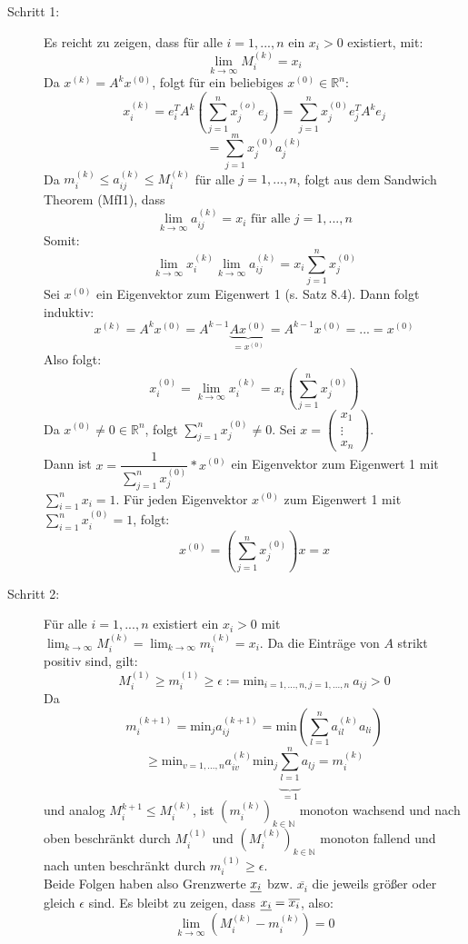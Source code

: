 \documentclass{scrbook}
\begin{document}
\begin{description}
\item[Schritt 1:] Es reicht zu zeigen, dass für alle $i=1,...,n$ ein  $x_i >0$ existiert, mit:
\[\lim_{k \to\infty} M^{(k)}_i=x_i\]
Da $x^{(k)}=A^kx^{(0)}$, folgt für ein beliebiges $x^{(0)} \in \mathbb{R}^n$:\[x^{(k)}_i = e^T_i A^k(\sum ^n_{j=1} x_j^{(o)}e_j)=\sum^n_{j=1}x_j^{(0)}e_j^T A^ke_j\]\[=\sum^m_{j=1}x^{(0)}_ja_j^{(k)}\]
Da $m^{(k)}_i \leq a^{(k)}_{ij}\leq M^{(k)}_i$ für alle $j=1,...,n$, folgt aus dem Sandwich Theorem (MfI1), dass \[\lim_{k\to \infty} a^{(k)}_{ij} = x_i \text{ für alle }j=1,...,n\]
Somit:
\[\lim_{k\to\infty}x^{(k)}_i \lim_{k \to \infty}a^{(k)}_{ij}=x_i\sum^n_{j=1}x^{(0)}_j\]
Sei $x^{(0)}$ ein Eigenvektor zum Eigenwert 1 (s. Satz 8.4). Dann folgt induktiv:
\[x^{(k)}=A^kx^{(0)} = A^{k-1} \underbrace{Ax^{(0)}}_{=x^{(0)}}=A^{k-1}x^{(0)} = ... = x^{(0)}\]
Also folgt:
\[x^{(0)}_i = \lim_{k\to \infty}x^{(k)}_i = x_i \left(\sum^n_{j=1} x^{(0)}_j\right)\]
Da $x^{(0)} \neq 0 \in \mathbb{R}^n$, folgt $\sum^n_{j=1}x^{(0)}_j\neq 0$. Sei $x = \left(
\begin{array}{c}
x_1\\\vdots\\x_n
\end{array}
\right)$.\\ Dann ist $x=\dfrac{1}{\sum^n_{j=1}x^{(0)}_j}*x^{(0)}$ ein Eigenvektor zum Eigenwert 1 mit $\sum^n_{i=1}x_i = 1$. Für jeden Eigenvektor $x^{(0)}$ zum Eigenwert 1 mit $\sum^n_{i=1} x_i^{(0)} = 1$, folgt:
\[x^{(0)} = \left(\sum^n_{j=1}x^{(0)}_j\right)x = x\]
\item[Schritt 2:] Für alle $i=1,...,n$ existiert ein $x_i>0$ mit $\lim_{k\to \infty} M^{(k)}_i = \lim_{k\to \infty} m^{(k)}_i = x_i$. Da die Einträge von $A$ strikt positiv sind, gilt:
\[M^{(1)}_i \geq m^{(1)}_i \geq \epsilon := \text{min}_{i=1,...,n,j=1,...,n}\ a_{ij}>0\]
Da
\[m_i^{(k+1)} = \text{min}_j a_{ij}^{(k+1)} = \text{min} \left( \sum^n_{l=1}a_{il}^{(k)}a_{li}\right)\]\[\geq \text{min}_{v=1,...,n}a^{(k)}_{iv} \text{min}_j \underbrace{\sum^n_{l=1}}_{=1}a_{lj} = m^{(k)}_i\]
und analog $M^{k+1}_i \leq M^{(k)}_i$, ist $(m^{(k)}_i)_{k\in \mathbb{N}}$ monoton wachsend und nach oben beschränkt durch $M^{(1)}_i$ und $(M^{(k)}_i)_{k\in \mathbb{N}}$ monoton fallend und nach unten beschränkt durch $m^{(1)}_i \geq \epsilon$.\\
Beide Folgen haben also Grenzwerte $\uline{x_i}$ bzw. $\overline{x_i}$ die jeweils größer oder gleich $\epsilon$ sind. Es bleibt zu zeigen, dass $\uline{x_i}= \overline{x_i}$, also:\[\lim_{k\to\infty}(M^{(k)}_i -m^{(k)}_i)=0\]

\end{description}
\end{document}
